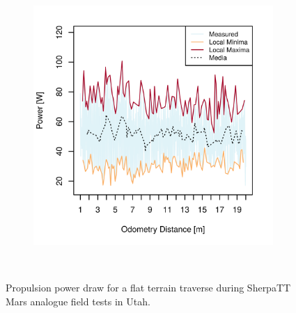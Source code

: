 \begin{figure}[h]
\begin{subfigure}[t]{\subfigureWidth}
        \label{fig:plot:sub:sherpatt-flat-terrain-power-draw-1}
    \end{subfigure}\hfill
    \begin{subfigure}[t]{\subfigureWidth}
        \centering
        \includegraphics[height=\graphicsHeight]{sections/design/power-budget/plots/locomotion-power-draw-on-flat-terrain-2.png}
		\label{fig:plot:sub:sherpatt-flat-terrain-power-draw-2}
	\end{subfigure}\\[0.8ex]
    \caption[Propulsion power draw for a flat terrain traverse during SherpaTT Mars analogue field tests in Utah]
            {Propulsion power draw for a flat terrain traverse during SherpaTT Mars analogue field tests in Utah.}
    \label{fig:plot:sherpatt-flat-terrain-power-draw}
\vspace{-2ex}
\end{figure}





\pagebreak
